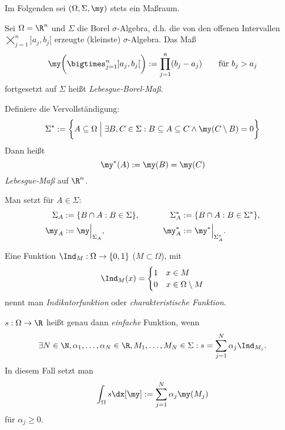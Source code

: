 \begin{conv*}
	Im Folgenden sei $(\Omega, \Sigma, \my)$ stets ein Maßraum.
\end{conv*}

\begin{ex}[Anwendung]
	Sei $\Omega = \R^n$ und $\Sigma$ die Borel $\sigma$-Algebra, d.h. die von den offenen Intervallen $\bigtimes_{j=1}^n ]a_j,b_j[$ erzeugte (kleinste) $\sigma$-Algebra.
	Das Maß
	\[
		\my \bigg( \bigtimes_{j=1}^n ]a_j,b_j[ \bigg) := \prod_{j=1}^n (b_j - a_j)
		\qquad \text{für $b_j > a_j$}
	\]
	fortgesetzt auf $\Sigma$ heißt \emph{Lebesgue-Borel-Maß}.

	Definiere die Vervollständigung:
	\[
		\Sigma^* := \bigg\{ A \subset \Omega \;\Big|\; \exists B,C \in \Sigma : B \subset A \subset C \land \my(C \setminus B) = 0 \bigg\}
	\]
	Dann heißt
	\[
		\my^*(A) := \my(B) = \my(C)
	\]
	\emph{Lebesgue-Maß} auf $\R^n$.

	Man setzt für $A \in \Sigma$:
	\begin{alignat*}{2}
		\Sigma_A &:= \{ B \cap A : B \in \Sigma \}, &\qquad
		\Sigma_A^* &:= \{ B \cap A : B \in \Sigma^* \}, \\
		\my_A &:= \my \Big|_{\Sigma_A}, &\qquad
		\my_A^* &:= \my^* \Big|_{\Sigma_A^*}.
	\end{alignat*}
\end{ex}

\begin{df*}
	Eine Funktion $\Ind_M: \Omega \to \{0,1\}$ ($M \subset \Omega$), mit
	\[
		\Ind_M (x) = \begin{cases}
			1 & x\in M \\
			0 & x \in \Omega \setminus M
		\end{cases}
	\]
	nennt man \emph{Indikatorfunktion} oder \emph{charakteristische Funktion}.

	$s:\Omega \to \R$ heißt genau dann \emph{einfache} Funktion, wenn
	\[
		\exists N \in \N, \alpha_1, \dotsc, \alpha_N \in \R, M_1, \dotsc, M_N \in \Sigma : s = \sum_{j=1}^N \alpha_j \Ind_{M_j}.
	\]
	In diesem Fall setzt man
	\[
		\int_{\Omega} s \dx[\my] := \sum_{j=1}^N \alpha_j \my(M_j)
	\]
	für $\alpha_j \ge 0$.
\end{df*}

